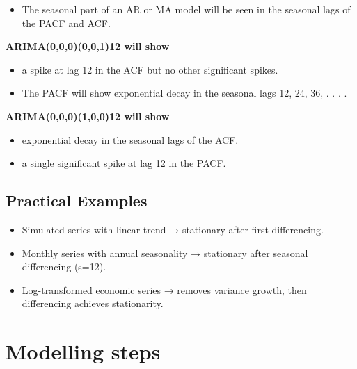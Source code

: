 \documentclass[
  11pt,
  a4paper,
]{report}
\providecommand{\tightlist}{%
  \setlength{\itemsep}{0pt}\setlength{\parskip}{0pt}}\usepackage{longtable,booktabs,array}
\begin{document}
\begin{itemize}
\tightlist
\item
  The seasonal part of an AR or MA model will be seen in the seasonal
  lags of the PACF and ACF.
\end{itemize}

\textbf{ARIMA(0,0,0)(0,0,1)12 will show}

\begin{itemize}
\item
  a spike at lag 12 in the ACF but no other significant spikes.
\item
  The PACF will show exponential decay in the seasonal lags 12, 24, 36,
  . . . .
\end{itemize}

\textbf{ARIMA(0,0,0)(1,0,0)12 will show}

\begin{itemize}
\item
  exponential decay in the seasonal lags of the ACF.
\item
  a single significant spike at lag 12 in the PACF.
\end{itemize}

\subsection{Practical Examples}\label{practical-examples}

\begin{itemize}
\item
  Simulated series with linear trend → stationary after first
  differencing.
\item
  Monthly series with annual seasonality → stationary after seasonal
  differencing (s=12).
\item
  Log-transformed economic series → removes variance growth, then
  differencing achieves stationarity.
\end{itemize}

\section{Modelling steps}\label{modelling-steps}
\end{document}
